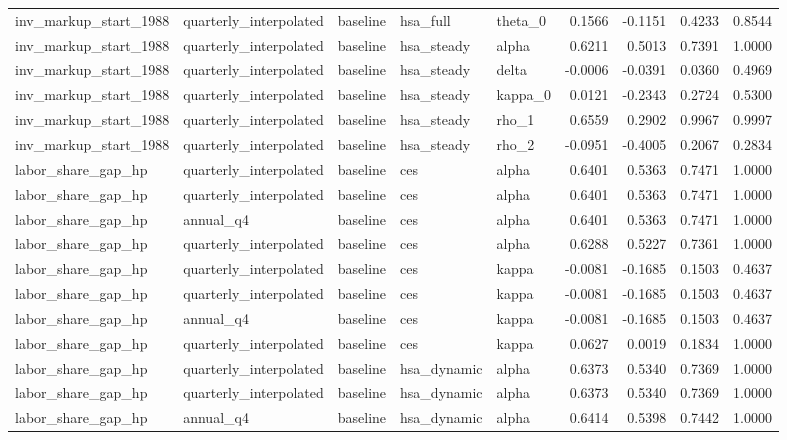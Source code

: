\begin{tabular}{lllllrrrr}
inv\_markup\_start\_1988 & quarterly\_interpolated & baseline & hsa\_full & theta\_0 & 0.1566 & -0.1151 & 0.4233 & 0.8544 \\
inv\_markup\_start\_1988 & quarterly\_interpolated & baseline & hsa\_steady & alpha & 0.6211 & 0.5013 & 0.7391 & 1.0000 \\
inv\_markup\_start\_1988 & quarterly\_interpolated & baseline & hsa\_steady & delta & -0.0006 & -0.0391 & 0.0360 & 0.4969 \\
inv\_markup\_start\_1988 & quarterly\_interpolated & baseline & hsa\_steady & kappa\_0 & 0.0121 & -0.2343 & 0.2724 & 0.5300 \\
inv\_markup\_start\_1988 & quarterly\_interpolated & baseline & hsa\_steady & rho\_1 & 0.6559 & 0.2902 & 0.9967 & 0.9997 \\
inv\_markup\_start\_1988 & quarterly\_interpolated & baseline & hsa\_steady & rho\_2 & -0.0951 & -0.4005 & 0.2067 & 0.2834 \\
labor\_share\_gap\_hp & quarterly\_interpolated & baseline & ces & alpha & 0.6401 & 0.5363 & 0.7471 & 1.0000 \\
labor\_share\_gap\_hp & quarterly\_interpolated & baseline & ces & alpha & 0.6401 & 0.5363 & 0.7471 & 1.0000 \\
labor\_share\_gap\_hp & annual\_q4 & baseline & ces & alpha & 0.6401 & 0.5363 & 0.7471 & 1.0000 \\
labor\_share\_gap\_hp & quarterly\_interpolated & baseline & ces & alpha & 0.6288 & 0.5227 & 0.7361 & 1.0000 \\
labor\_share\_gap\_hp & quarterly\_interpolated & baseline & ces & kappa & -0.0081 & -0.1685 & 0.1503 & 0.4637 \\
labor\_share\_gap\_hp & quarterly\_interpolated & baseline & ces & kappa & -0.0081 & -0.1685 & 0.1503 & 0.4637 \\
labor\_share\_gap\_hp & annual\_q4 & baseline & ces & kappa & -0.0081 & -0.1685 & 0.1503 & 0.4637 \\
labor\_share\_gap\_hp & quarterly\_interpolated & baseline & ces & kappa & 0.0627 & 0.0019 & 0.1834 & 1.0000 \\
labor\_share\_gap\_hp & quarterly\_interpolated & baseline & hsa\_dynamic & alpha & 0.6373 & 0.5340 & 0.7369 & 1.0000 \\
labor\_share\_gap\_hp & quarterly\_interpolated & baseline & hsa\_dynamic & alpha & 0.6373 & 0.5340 & 0.7369 & 1.0000 \\
labor\_share\_gap\_hp & annual\_q4 & baseline & hsa\_dynamic & alpha & 0.6414 & 0.5398 & 0.7442 & 1.0000 \\

\end{tabular}

